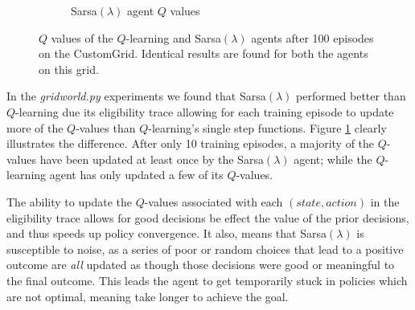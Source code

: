 \documentclass[10pt,conference]{IEEEtran}
\begin{document}
\begin{figure}[h]
\begin{subfigure}[b]{0.40\textwidth}
			\caption{Sarsa\((\lambda)\) agent \(Q\) values}
		\end{subfigure}
		\caption{\(Q\) values of the \(Q\)-learning and Sarsa\((\lambda)\) agents 
		after 100 episodes on the CustomGrid. Identical results are found for both the agents on this grid.}
		\label{qvalues}
	\end{figure}

	In the \textit{gridworld.py} experiments we found that Sarsa\((\lambda)\) 
	performed better than \(Q\)-learning due its eligibility trace allowing for
	each training episode to update more of the \(Q\)-values than \(Q\)-learning's
	single step functions.  Figure \ref{qvalues} clearly illustrates the difference. 
	After only 10 training episodes, a majority of the \(Q\)-values have been
	updated at least once by the Sarsa\((\lambda)\) agent; while the \(Q\)-learning
	agent has only updated a few of its \(Q\)-values.

	The ability to update the \(Q\)-values associated with each \((state,action)\) 
	in the eligibility trace allows for good decisions be effect the value of the 
	prior decisions, and thus speeds up policy convergence.  It also, means that
	Sarsa\((\lambda)\) is susceptible to noise, as a series of poor or random choices 
	that lead to a positive outcome are \textit{all} updated as though those 
	decisions were good or meaningful to the final outcome.  This leads the agent
	to get temporarily stuck in policies which are not optimal, meaning take longer
	to achieve the goal.
\end{document}
